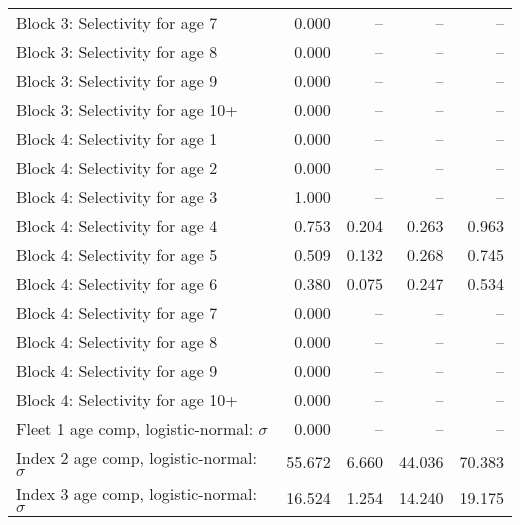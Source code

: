 \documentclass[
]{article}
\begin{document}
\begin{landscape}
\begin{longtable}[t]{lrrrr}
Block 3: Selectivity for age 7 & 0.000 & -- & -- & --\\
Block 3: Selectivity for age 8 & 0.000 & -- & -- & --\\
Block 3: Selectivity for age 9 & 0.000 & -- & -- & --\\
Block 3: Selectivity for age 10+ & 0.000 & -- & -- & --\\
\addlinespace
Block 4: Selectivity for age 1 & 0.000 & -- & -- & --\\
Block 4: Selectivity for age 2 & 0.000 & -- & -- & --\\
Block 4: Selectivity for age 3 & 1.000 & -- & -- & --\\
Block 4: Selectivity for age 4 & 0.753 & 0.204 & 0.263 & 0.963\\
Block 4: Selectivity for age 5 & 0.509 & 0.132 & 0.268 & 0.745\\
\addlinespace
Block 4: Selectivity for age 6 & 0.380 & 0.075 & 0.247 & 0.534\\
Block 4: Selectivity for age 7 & 0.000 & -- & -- & --\\
Block 4: Selectivity for age 8 & 0.000 & -- & -- & --\\
Block 4: Selectivity for age 9 & 0.000 & -- & -- & --\\
Block 4: Selectivity for age 10+ & 0.000 & -- & -- & --\\
\addlinespace
Fleet 1 age comp, logistic-normal: $\sigma$ & 0.000 & -- & -- & --\\
Index 2 age comp, logistic-normal: $\sigma$ & 55.672 & 6.660 & 44.036 & 70.383\\
Index 3 age comp, logistic-normal: $\sigma$ & 16.524 & 1.254 & 14.240 & 19.175\\*
\end{longtable}
\end{landscape}
\end{document}
